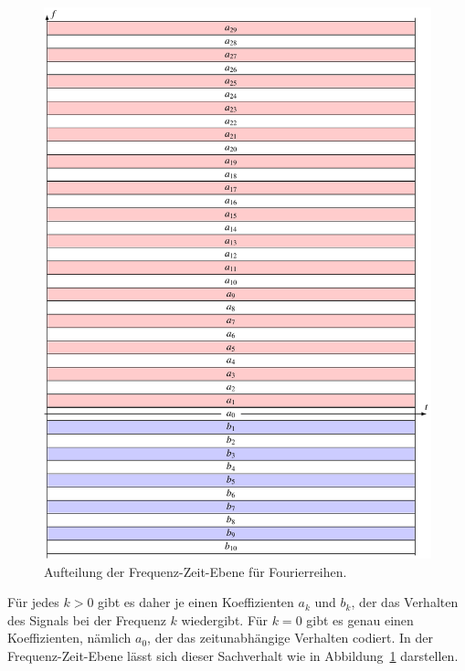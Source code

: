 \begin{figure}
\centering
\includegraphics{chapters/2-fourier/images/ft.pdf}
\caption{Aufteilung der Frequenz-Zeit-Ebene für Fourierreihen.
\label{ft:ftplane}}
\end{figure}

Für jedes $k>0$ gibt es daher je einen Koeffizienten $a_k$ und $b_k$,
der das Verhalten des Signals bei der Frequenz $k$ wiedergibt.
Für $k=0$ gibt es genau einen Koeffizienten, nämlich $a_0$, der das
zeitunabhängige Verhalten codiert.
In der Frequenz-Zeit-Ebene lässt sich dieser Sachverhalt wie in 
Abbildung~\ref{ft:ftplane} darstellen.

